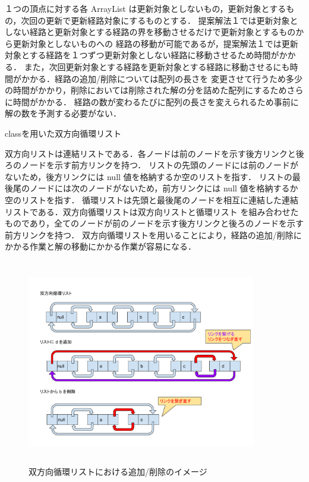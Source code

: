 \documentclass[12pt]{optlab-bachelor}
\begin{document}
１つの頂点に対する各 ArrayList は更新対象としないもの，更新対象とするもの，次回の更新で更新経路対象にするものとする．
提案解法１では更新対象としない経路と更新対象とする経路の界を移動させるだけで更新対象とするものから更新対象としないものへの
経路の移動が可能であるが，提案解法１では更新対象とする経路を１つずつ更新対象としない経路に移動させるため時間がかかる．
また，次回更新対象とする経路を更新対象とする経路に移動させるにも時間がかかる．経路の追加/削除については配列の長さを
変更させて行うため多少の時間がかかり，削除においては削除された解の分を詰めた配列にするためさらに時間がかかる．
経路の数が変わるたびに配列の長さを変えられるため事前に解の数を予測する必要がない．

\begin{description}
  \item[classを用いた双方向循環リスト]
\end{description}

双方向リストは連結リストである．各ノードは前のノードを示す後方リンクと後ろのノードを示す前方リンクを持つ．
リストの先頭のノードには前のノードがないため，後方リンクには null 値を格納するか空のリストを指す．
リストの最後尾のノードには次のノードがないため，前方リンクには null 値を格納するか空のリストを指す．
循環リストは先頭と最後尾のノードを相互に連結した連結リストである．双方向循環リストは双方向リストと循環リスト
を組み合わせたものであり，全てのノードが前のノードを示す後方リンクと後ろのノードを示す前方リンクを持つ．
双方向循環リストを用いることにより，経路の追加/削除にかかる作業と解の移動にかかる作業が容易になる．

\begin{figure}[htbp]
  \centering
  \caption{双方向循環リストにおける追加/削除のイメージ}
  \includegraphics[height=9.0cm, width=10.0cm]{fig/fig10.pdf}
\end{figure}
\end{document}
